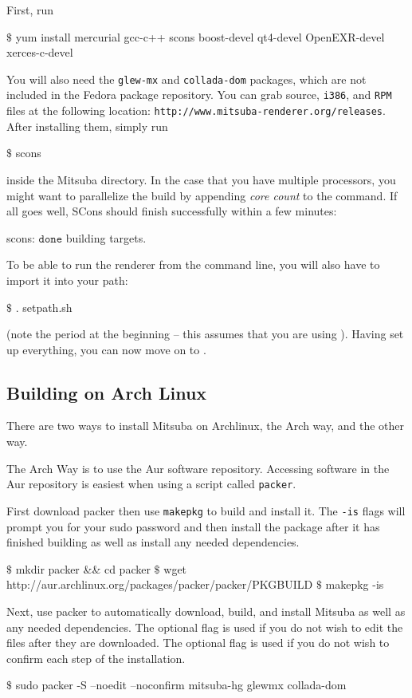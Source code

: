 First, run
\begin{shell}
$\text{\$}$ yum install mercurial gcc-c++ scons boost-devel qt4-devel OpenEXR-devel xerces-c-devel
\end{shell}
You will also need the \texttt{glew-mx} and \texttt{collada-dom} packages, which are not included in the Fedora package repository. 
You can grab source, \texttt{i386}, and  \texttt{RPM} files at the following location: \texttt{http://www.mitsuba-renderer.org/releases}.
After installing them, simply run
\begin{shell}
$\text{\$}$ scons
\end{shell}
inside the Mitsuba directory. In the case that you have multiple processors, you might want to parallelize the build by appending \emph{core count} to the command.
If all goes well, SCons should finish successfully within a few minutes:
\begin{shell}
scons: $\texttt{done}$ building targets.
\end{shell}
To be able to run the renderer from the command line, you will also have to import it into your path:
\begin{shell}
$\text{\$}$ . setpath.sh
\end{shell}
(note the period at the beginning -- this assumes that you are using ).
Having set up everything, you can now move on to .

\subsection{Building on Arch Linux}
There are two ways to install Mitsuba on Archlinux, the Arch way, and the other way.

The Arch Way is to use the Aur software repository. 
Accessing software in the Aur repository is easiest when using a script called \texttt{packer}.

First download packer then use \texttt{makepkg} to build and install it. 
The \texttt{-is} flags will prompt you for your sudo password and then install the package after it has finished building as well as install any needed dependencies.
\begin{shell}
$\text{\$}$ mkdir packer && cd packer
$\text{\$}$ wget http://aur.archlinux.org/packages/packer/packer/PKGBUILD
$\text{\$}$ makepkg -is
\end{shell}

Next, use packer to automatically download, build, and install Mitsuba as well as any needed dependencies.
The optional  flag is used if you do not wish to edit the files after they are downloaded.
The optional  flag is used if you do not wish to confirm each step of the installation. 
\begin{shell}
$\text{\$}$ sudo packer -S --noedit --noconfirm mitsuba-hg glewmx collada-dom
\end{shell}


